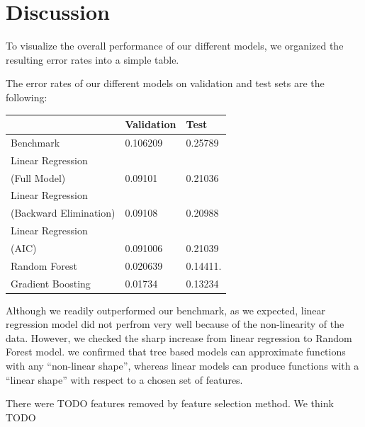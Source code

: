 \documentclass[letterpaper,twocolumn,11pt]{article}
\begin{document}
\section{Discussion}
To visualize the overall performance of our different models, we organized the resulting error rates into a simple table. 

The error rates of our different models on validation and test sets are the following:
\begin{center}
    \begin{tabular}{| l | l | l |}
      \hline
       & Validation & Test \\ \hline
      Benchmark & 0.106209 & 0.25789  \\ \hline
      Linear Regression \\
      (Full Model) & 0.09101 & 0.21036 \\ \hline
      Linear Regression \\
      (Backward Elimination) & 0.09108 & 0.20988 \\ \hline
      Linear Regression \\
      (AIC) & 0.091006 & 0.21039 \\ \hline
      Random Forest & 0.020639 & 0.14411.  \\ \hline
      Gradient Boosting & 0.01734 & 0.13234  \\ \hline
      \hline    
    \end{tabular}
\end{center}

Although we readily outperformed our benchmark, as we expected, linear regression model did not perfrom very well because of the non-linearity of the data. However, we checked the sharp increase from linear regression to Random Forest model. we confirmed that tree based models can approximate functions with any ``non-linear shape'', whereas linear models can produce functions with a ``linear shape'' with respect to a chosen set of features. 

There were TODO features removed by feature selection method. We think TODO 
\end{document}
